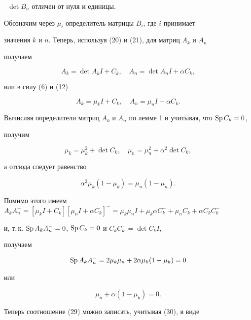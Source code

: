 \begin{pf}
\ $\det B_n$ отличен от нуля и единицы. 


 


Обозначим через $\mu_i$ определитель матрицы $B_i$, где $i$ принимает 


значения $k$ и $n$. Теперь, используя (20) и (21), для матриц $A_k$ и $A_n$ 


получаем 


$$ 


A_k=\det A_k I+C_k,\quad A_n=\det A_n I+\alpha C_k, 


$$ 


или в силу (6) и (12) 


$$ 


A_k=\mu_k I+C_k,\quad A_n=\mu_n I+\alpha C_k. 


$$ 


Вычисляя определители матриц $A_k$ и $A_n$ по лемме 1 и учитывая, что $\Sp 


C_k=0$, 


получим 


$$ 


\mu_k=\mu^2_k+\det C_k,\quad \mu_n=\mu^2_n+\alpha^2\det C_k, 


$$ 


а отсюда следует равенство 


\begin{equation} 


\alpha^2\mu_k(1-\mu_k)=\mu_n(1-\mu_n). 


\end{equation} 


Помимо этого имеем $A_k A^-_n=[\mu_k I+C_k][\mu_n I+\alpha C_k]^-= 


\mu_k\mu_n I+\mu_k\alpha C^-_k+ \mu_n C_k+\alpha C_k C^-_k$ 


и, т.\,к. $\operatorname{Sp} A_k A^-_n=0$, $\operatorname{Sp} C_k=0$ и $C_k C^-_k=\det C_k I$, 


получаем 


$$ 


\Sp A_k A^-_n=2\mu_k\mu_n+2\alpha\mu_k(1-\mu_k)=0 


$$ 


или 


\begin{equation} 


\mu_n+\alpha(1-\mu_k)=0. 


\end{equation} 


Теперь соотношение (29) можно записать, учитывая (30), в виде 



\end{pf}
